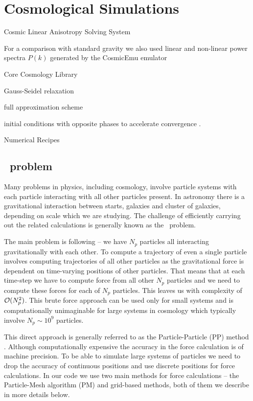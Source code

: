 \chapter{Cosmological Simulations}
Cosmic Linear Anisotropy Solving System \parencite[CLASS,][]{class}

For a comparison with standard gravity we also used linear and non-linear power spectra $P(k)$ generated by the CosmicEmu emulator \parencite{Heitmann:2015xma}

Core Cosmology Library \parencite{2018arXiv181205995C}

Gauss-Seidel relaxation \parencite{doi:10.1002/zamm.19720520813}

full approximation scheme \parencite[FAS, see, e.g.,][]{MG_overview}

initial conditions with opposite phases to accelerate convergence \parencite{PhysRevD.93.103519}.

Numerical Recipes \parencite{10.5555/42249}


\section{\nbody\ problem}
Many problems in physics, including cosmology, involve particle systems with each particle interacting with all other particles present. In astronomy there is a gravitational interaction between starts, galaxies and cluster of galaxies, depending on scale which we are studying. The challenge of efficiently carrying out the related calculations is generally known as the \nbody\ problem.

The main problem is following -- we have $N_p$ particles all interacting gravitationally with each other. To compute a trajectory of even a single particle involves computing trajectories of all other particles as the gravitational force is dependent on time-varying positions of other particles. That means that at each time-step we have to compute force from all other $N_p$ particles and we need to compute these forces for each of $N_p$ particles. This leaves us with complexity of \(\mathcal{O}(N_p^2)\). This brute force approach can be used only for small systems and is computationally unimaginable for large systems in cosmology which typically involve \(N_p\sim10^{9}\) particles.

This direct approach is generally referred to as the Particle-Particle (PP) method \parencite{Hockney:1988:CSU:62815}. Although computationally expensive the accuracy in the force calculation is of machine precision. To be able to simulate large systems of particles we need to drop the accuracy of continuous positions and use discrete positions for force calculations. In our code we use two main methods for force calculations -- the Particle-Mesh algorithm (PM) and grid-based methods, both of them we describe in more details below.
